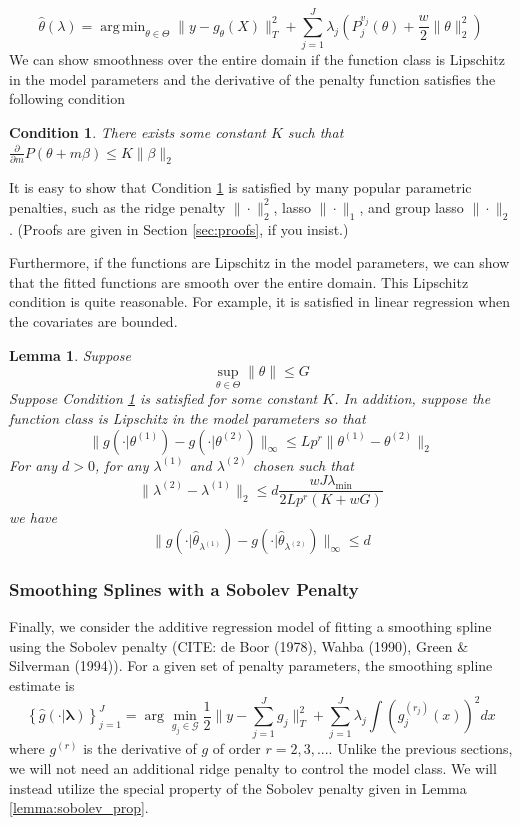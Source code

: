 \documentclass[12pt]{article}
\newtheorem{lemma}{Lemma}
\newtheorem{condition}{Condition}
\DeclareMathOperator*{\argmin}{arg\,min}
\begin{document}
\begin{equation}
\hat{\theta}(\lambda) = \argmin_{\theta \in \Theta} \| y -  g_\theta(X) \|^2_T + \sum_{j=1}^J \lambda_j \left ( P^{v_j}_j(\theta) + \frac{w}{2} \| \theta \|^2_2 \right )
\end{equation}
We can show smoothness over the entire domain if the function class is Lipschitz in the model parameters and the derivative of the penalty function satisfies the following condition

\begin{condition}
\label{condn:param}
There exists some constant $K$ such that 
$\frac{\partial}{\partial m}P(\theta + m \beta) \le K \|\beta\|_{2}$
\end{condition}

It is easy to show that Condition \ref{condn:param} is satisfied by many popular parametric penalties, such as the ridge penalty $\| \cdot \|_2^2$, lasso $\| \cdot \|_1$, and group lasso $\| \cdot \|_2$. (Proofs are given in Section \ref{sec:proofs}, if you insist.)

Furthermore, if the functions are Lipschitz in the model parameters, we can show that the fitted functions are smooth over the entire domain. This Lipschitz condition is quite reasonable. For example, it is satisfied in linear regression when the covariates are bounded.

\begin{lemma}
\label{lemma:parametric}
Suppose 
\[
\sup_{\theta\in\Theta}\|\theta\|\le G
\]
Suppose Condition \ref{condn:param} is satisfied for some constant $K$.
In addition, suppose the function class is Lipschitz in the model parameters so that
\[
\|g(\cdot|\theta^{(1)})-g(\cdot|\theta^{(2)})\|_{\infty}\le Lp^{r}\|\theta^{(1)}-\theta^{(2)}\|_{2}
\]
For any $d>0$, for any $\lambda^{(1)}$ and $\lambda^{(2)}$ chosen such that 
\[
\|\lambda^{(2)}-\lambda^{(1)}\|_{2}\le d\frac{wJ\lambda_{\min}}{2Lp^{r}\left(K+wG\right)}
\]
we have
\[
\|g(\cdot|\hat{\theta}_{\lambda^{(1)}})-g(\cdot|\hat{\theta}_{\lambda^{(2)}})\|_{\infty}\le d
\]
\end{lemma}

\subsubsection{Smoothing Splines with a Sobolev Penalty}

Finally, we consider the additive regression model of fitting a smoothing spline using the Sobolev penalty (CITE: de Boor (1978), Wahba (1990), Green \& Silverman (1994)). For a given set of penalty parameters, the smoothing spline estimate is
\begin{equation}
\left \{ \hat{g}(\cdot | \boldsymbol \lambda) \right \}_{j=1}^J =\arg\min_{g_j\in\mathcal{G}}\frac{1}{2}\|y- \sum_{j=1}^J g_j\|_{T}^{2}+ \sum_{j=1}^J \lambda_j \int (g_j^{(r_j)}(x))^2 dx
\end{equation}
where $g^{(r)}$ is the derivative of $g$ of order $r =  2,3,...$. Unlike the previous sections, we will not need an additional ridge penalty to control the model class. We will instead utilize the special property of the Sobolev penalty given in Lemma \ref{lemma:sobolev_prop}.
\end{document}

